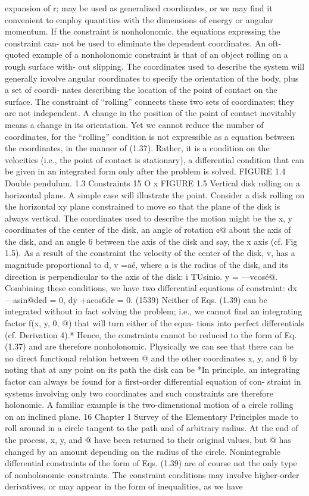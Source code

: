 expansion of r; may be used as generalized coordinates, or we may find it convenient to employ quantities with the dimensions of energy or angular momentum. If the constraint is nonholonomic, the equations expressing the constraint can- not be used to eliminate the dependent coordinates. An oft-quoted example of a nonholonomic constraint is that of an object rolling on a rough surface with- out slipping. The coordinates used to describe the system will generally involve angular coordinates to specify the orientation of the body, plus a set of coordi- nates describing the location of the point of contact on the surface. The constraint of “rolling” connects these two sets of coordinates; they are not independent. A change in the position of the point of contact inevitably means a change in its orientation. Yet we cannot reduce the number of coordinates, for the “rolling” condition is not expressible as a equation between the coordinates, in the manner of (1.37). Rather, it is a condition on the velocities (i.e., the point of contact is stationary), a differential condition that can be given in an integrated form only after the problem is solved. FIGURE 1.4 Double pendulum. 1.3 Constraints 15 O x FIGURE 1.5 Vertical disk rolling on a horizontal plane. A simple case will illustrate the point. Consider a disk rolling on the horizontal xy plane constrained to move so that the plane of the disk is always vertical. The coordinates used to describe the motion might be the x, y coordinates of the center of the disk, an angle of rotation ¢@ about the axis of the disk, and an angle 6 between the axis of the disk and say, the x axis (cf. Fig 1.5). As a result of the constraint the velocity of the center of the disk, v, has a magnitude proportional to d, v =aé, where a is the radius of the disk, and its direction is perpendicular to the axis of the disk: i TUsinio. y = —vcosé@. Combining these conditions, we have two differential equations of constraint: dx —asin@d¢d = 0, dy +acos6d¢ = 0. (1539) Neither of Eqs. (1.39) can be integrated without in fact solving the problem; i.e., we cannot find an integrating factor f(x, y, 0, @) that will turn either of the equa- tions into perfect differentials (cf. Derivation 4).* Hence, the constraints cannot be reduced to the form of Eq. (1.37) and are therefore nonholonomic. Physically we can see that there can be no direct functional relation between @ and the other coordinates x, y, and 6 by noting that at any point on its path the disk can be *In principle, an integrating factor can always be found for a first-order differential equation of con- straint in systems involving only two coordinates and such constraints are therefore holonomic. A familiar example is the two-dimensional motion of a circle rolling on an inclined plane. 16 Chapter 1 Survey of the Elementary Principles made to roll around in a circle tangent to the path and of arbitrary radius. At the end of the process, x, y, and @ have been returned to their original values, but @ has changed by an amount depending on the radius of the circle. Nonintegrable differential constraints of the form of Eqs. (1.39) are of course not the only type of nonholonomic constraints. The constraint conditions may involve higher-order derivatives, or may appear in the form of inequalities, as we have 